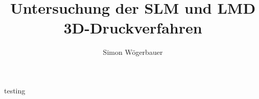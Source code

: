 \documentclass[12pt]{article}
\title{Untersuchung der SLM und LMD 3D-Druckverfahren}
\author{Simon Wögerbauer}
\begin{document}

\cite{key}
testing
\blindtext[12]
{}

\end{document}
